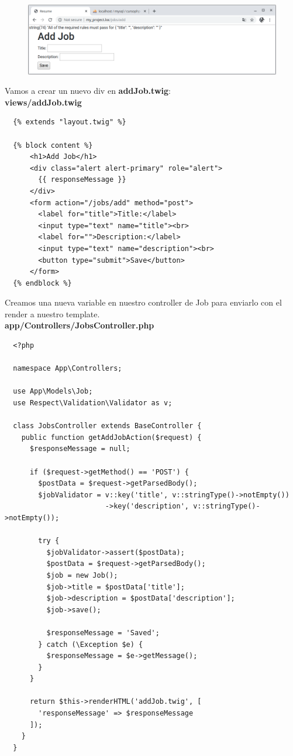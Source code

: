 \documentclass{article}
\begin{document}
\begin{figure}[h!]
  \centering
  \includegraphics[scale=0.5]{./Pictures/167_error_capturado.png}
\end{figure}

Vamos a crear un nuevo div en \textbf{addJob.twig}:\\

\textbf{views/addJob.twig}
\begin{verbatim}
  {% extends "layout.twig" %}

  {% block content %}
      <h1>Add Job</h1>
      <div class="alert alert-primary" role="alert">
        {{ responseMessage }}
      </div>
      <form action="/jobs/add" method="post">
        <label for="title">Title:</label>
        <input type="text" name="title"><br>
        <label for="">Description:</label>
        <input type="text" name="description"><br>
        <button type="submit">Save</button>
      </form>
  {% endblock %}
\end{verbatim}

Creamos una nueva variable en nuestro controller de Job para enviarlo con el
render a nuestro template.\\

\textbf{app/Controllers/JobsController.php}
\begin{verbatim}
  <?php

  namespace App\Controllers;

  use App\Models\Job;
  use Respect\Validation\Validator as v;

  class JobsController extends BaseController {
    public function getAddJobAction($request) {
      $responseMessage = null;

      if ($request->getMethod() == 'POST') {
        $postData = $request->getParsedBody();
        $jobValidator = v::key('title', v::stringType()->notEmpty())
                        ->key('description', v::stringType()->notEmpty());

        try {
          $jobValidator->assert($postData);
          $postData = $request->getParsedBody();
          $job = new Job();
          $job->title = $postData['title'];
          $job->description = $postData['description'];
          $job->save();

          $responseMessage = 'Saved';
        } catch (\Exception $e) {
          $responseMessage = $e->getMessage();
        }
      }

      return $this->renderHTML('addJob.twig', [
        'responseMessage' => $responseMessage
      ]);
    }
  }
\end{verbatim}
\end{document}
